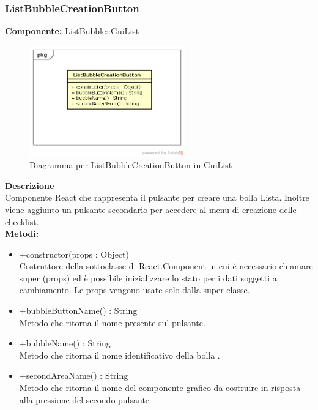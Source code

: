 \subsubsection{ListBubbleCreationButton}
\textbf{Componente:}  ListBubble::GuiList\\
   \FloatBarrier
   \begin{figure}[ht]
   \centering
   \includegraphics[width=0.6\textwidth]{img/single-ListBubbleCreationButton.png}
   \caption{{Diagramma per ListBubbleCreationButton in GuiList}}
\end{figure}
\FloatBarrier
\textbf{Descrizione}\\
Componente React che rappresenta il pulsante per creare una bolla Lista. Inoltre viene aggiunto un pulsante secondario per accedere al menu di creazione delle checklist.
\\
\textbf{Metodi:} 
\begin{itemize}
\item +constructor(props : Object)  
\\
Costruttore della sottoclasse di React.Component in cui è necessario chiamare super (props) ed è possibile inizializzare lo stato per i dati soggetti a cambiamento. Le props vengono usate solo dalla super classe.

\item +bubbleButtonName() : String 
\\
Metodo che ritorna il nome presente sul pulsante.

\item +bubbleName() : String 
\\
Metodo che ritorna il nome identificativo della bolla .

\item +secondAreaName() : String
\\
Metodo che ritorna il nome del componente grafico da costruire in risposta alla pressione del secondo pulsante

\end{itemize} 


